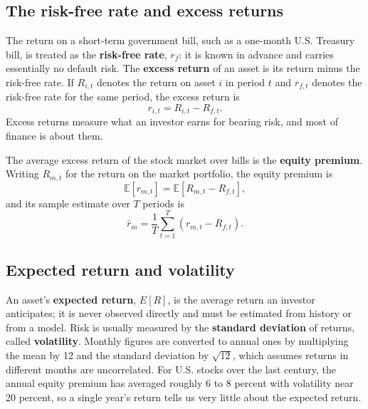 \subsection{The risk-free rate and excess returns}
\label{sec:01-rf}

The return on a short-term government bill, such as a one-month U.S. Treasury bill, is treated as the \textbf{risk-free rate}, $r_f$: it is known in advance and carries essentially no default risk. 
The \textbf{excess return} of an asset is its return minus the risk-free rate. If $R_{i,t}$ denotes the return on asset $i$ in period $t$ and $r_{f,t}$ denotes the risk-free rate for the same period, the excess return is
\begin{equation}
r_{i,t} = R_{i,t} - R_{f,t}.
\label{eq:excess-return}
\end{equation}
Excess returns measure what an investor earns for bearing risk, and most of finance is about them. 

The average excess return of the stock market over bills is the \textbf{equity premium}. Writing $R_{m,t}$ for the return on the market portfolio, the equity premium is
\begin{equation}
\mathbb{E}\left[r_{m,t}\right] = \mathbb{E}\left[R_{m,t} - R_{f,t}\right],
\label{eq:equity-premium}
\end{equation}
and its sample estimate over $T$ periods is
\begin{equation}
\bar{r}_{m} = \frac{1}{T}\sum_{t=1}^{T}\left(r_{m,t} - R_{f,t}\right).
\label{eq:equity-premium-sample}
\end{equation}




\subsection{Expected return and volatility}
\label{sec:01-expret}

An asset's \textbf{expected return}, $E[R]$, is the average return an investor anticipates; it is never observed directly and must be estimated from history or from a model. Risk is usually measured by the \textbf{standard deviation} of returns, called \textbf{volatility}. Monthly figures are converted to annual ones by multiplying the mean by 12 and the standard deviation by $\sqrt{12}$, which assumes returns in different months are uncorrelated. For U.S. stocks over the last century, the annual equity premium has averaged roughly 6 to 8 percent with volatility near 20 percent, so a single year's return tells us very little about the expected return.

